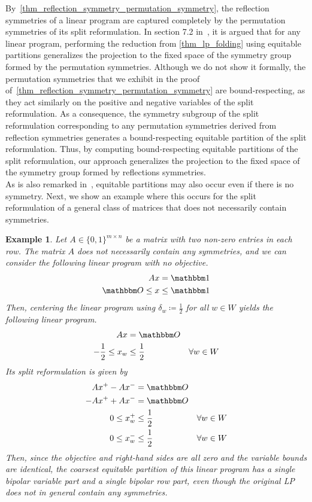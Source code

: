 \documentclass[pdflatex,sn-mathphys-num]{sn-jnl}%
\theoremstyle{thmstyleone}%
\theoremstyle{thmstylethree}%
\theoremstyle{thmstyletwo}%
\newtheorem{example}[example]{Example}
\begin{document}
By~\cref{thm_reflection_symmetry_permutation_symmetry}, the reflection symmetries of a linear program are captured completely by the permutation symmetries of its split reformulation. 
In section 7.2 in~\cite{Grohe2014}, it is argued that for any linear program, performing the reduction from \cref{thm_lp_folding} using equitable partitions generalizes the projection to the fixed space of the symmetry group formed by the permutation symmetries.
Although we do not show it formally, the permutation symmetries that we exhibit in the proof of~\cref{thm_reflection_symmetry_permutation_symmetry} are bound-respecting, as they act similarly on the positive and negative variables of the split reformulation. As a consequence, the symmetry subgroup of the split reformulation corresponding to any permutation symmetries derived from reflection symmetries generates a bound-respecting equitable partition of the split reformulation. 
Thus, by computing bound-respecting equitable partitions of the split reformulation, our approach generalizes the projection to the fixed space of the symmetry group formed by reflections symmetries.\\

As is also remarked in~\cite{Grohe2014}, equitable partitions may also occur even if there is no symmetry. Next, we show an example where this occurs for the split reformulation of a general class of matrices that does not necessarily contain symmetries.
\begin{example}
    Let $A\in \{0,1\}^{m\times n}$ be a matrix with two non-zero entries in each row. The matrix $A$ does not necessarily contain any symmetries, and we can consider the following linear program with no objective.
    \begin{align*}
        A x &= \onevec\\
        \zerovec \leq x &\leq \onevec
    \end{align*}
    Then, centering the linear program using $\delta_w \coloneqq \frac{1}{2}$ for all $w\in W$ yields the following linear program.
    \begin{align*}
        A x &= \zerovec\\
        -\frac{1}{2} \leq x_w &\leq \frac{1}{2} & \forall w\in W
    \end{align*}
    Its split reformulation is given by 
    \begin{align*}
        A x^+ - A x^- &= \zerovec\\
        -A x^+ + A x^- &= \zerovec\\
        0\leq x^+_w &\leq \frac{1}{2} & \forall w\in W\\
        0\leq x^-_w &\leq \frac{1}{2} & \forall w\in W
    \end{align*}
    Then, since the objective and right-hand sides are all zero and the variable bounds are identical, the coarsest equitable partition of this linear program has a single bipolar variable part and a single bipolar row part, even though the original LP does not in general contain any symmetries.
\end{example}
\end{document}
